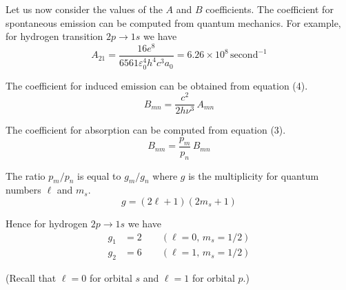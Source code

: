 \documentclass[12pt]{article}
\newcommand\BNM{B_{nm}} %
\newcommand\BMN{B_{mn}} %
\newcommand\AMN{A_{mn}} %
\begin{document}

Let us now consider the values of the $A$ and $B$ coefficients.
The coefficient for spontaneous emission can be computed from quantum mechanics.
For example, for hydrogen transition $2p\rightarrow1s$ we have
\begin{equation*}
A_{21}=\frac{16e^8}{6561\varepsilon_0^4h^4c^3a_0}
=6.26\times10^8\,\text{second}^{-1}
\end{equation*}

The coefficient for induced emission can be obtained from equation (4).
\begin{equation*}
\BMN=\frac{c^2}{2h\nu^3}\,\AMN
\end{equation*}

The coefficient for absorption can be computed from equation (3).
\begin{equation*}
\BNM=\frac{p_m}{p_n}\,\BMN
\end{equation*}

The ratio $p_m/p_n$ is equal to $g_m/g_n$ where $g$ is the multiplicity
for quantum numbers $\ell$ and $m_s$.
\begin{equation*}
g=(2\ell+1)(2m_s+1)
\end{equation*}

Hence for hydrogen $2p\rightarrow1s$ we have
\begin{align*}
g_1&=2\qquad(\ell=0,\,m_s=1/2)
\\
g_2&=6\qquad(\ell=1,\,m_s=1/2)
\end{align*}

(Recall that $\ell=0$ for orbital $s$ and $\ell=1$ for orbital $p$.)
\end{document}
